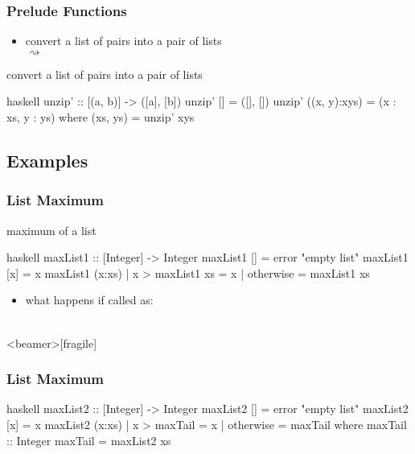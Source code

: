 \documentclass[dvipsnames]{beamer}
\theoremstyle{plain}
\begin{document}
\begin{frame}[fragile]
  \frametitle{Prelude Functions}

  \begin{itemize}
    \item convert a list of pairs into a pair of lists\\
       $\rightsquigarrow$
  \end{itemize}

  \begin{exampleblock}{convert a list of pairs into a pair of lists}
    \begin{pygments}{haskell}
unzip' :: [(a, b)] -> ([a], [b])
unzip' [] = ([], [])
unzip' ((x, y):xys) = (x : xs, y : ys)
  where
    (xs, ys) = unzip' xys
    \end{pygments}
  \end{exampleblock}
\end{frame}

\subsection{Examples}

\begin{frame}[fragile]
  \frametitle{List Maximum}

  \begin{exampleblock}{maximum of a list}
    \begin{pygments}{haskell}
maxList1 :: [Integer] -> Integer
maxList1 [] = error "empty list"
maxList1 [x] = x
maxList1 (x:xs)
  | x > maxList1 xs = x
  | otherwise       = maxList1 xs
    \end{pygments}
  \end{exampleblock}

  \pause
  \begin{itemize}
    \item what happens if called as:\\
      \\
  \end{itemize}
\end{frame}

\begin{frame}<beamer>[fragile]
  \frametitle{List Maximum}

  \begin{exampleblock}{}
    \begin{pygments}{haskell}
maxList2 :: [Integer] -> Integer
maxList2 [] = error "empty list"
maxList2 [x] = x
maxList2 (x:xs)
  | x > maxTail = x
  | otherwise   = maxTail
  where
    maxTail :: Integer
    maxTail = maxList2 xs
    \end{pygments}
  \end{exampleblock}
\end{frame}
\end{document}
